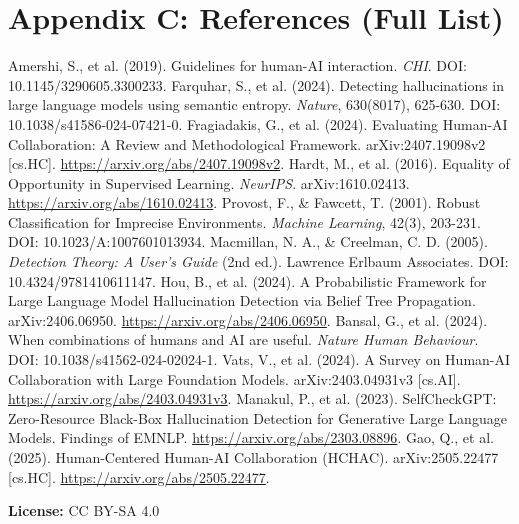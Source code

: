 \documentclass{article}
\begin{document}
\section*{Appendix C: References (Full List)}  

Amershi, S., et al. (2019). Guidelines for human-AI interaction. \textit{CHI}. DOI: 10.1145/3290605.3300233.  
Farquhar, S., et al. (2024). Detecting hallucinations in large language models using semantic entropy. \textit{Nature}, 630(8017), 625-630. DOI: 10.1038/s41586-024-07421-0.  
Fragiadakis, G., et al. (2024). Evaluating Human-AI Collaboration: A Review and Methodological Framework. arXiv:2407.19098v2 [cs.HC]. \url{https://arxiv.org/abs/2407.19098v2}.  
Hardt, M., et al. (2016). Equality of Opportunity in Supervised Learning. \textit{NeurIPS}. arXiv:1610.02413. \url{https://arxiv.org/abs/1610.02413}.  
Provost, F., \& Fawcett, T. (2001). Robust Classification for Imprecise Environments. \textit{Machine Learning}, 42(3), 203-231. DOI: 10.1023/A:1007601013934.  
Macmillan, N. A., \& Creelman, C. D. (2005). \textit{Detection Theory: A User's Guide} (2nd ed.). Lawrence Erlbaum Associates. DOI: 10.4324/9781410611147.  
Hou, B., et al. (2024). A Probabilistic Framework for Large Language Model Hallucination Detection via Belief Tree Propagation. arXiv:2406.06950. \url{https://arxiv.org/abs/2406.06950}.  
Bansal, G., et al. (2024). When combinations of humans and AI are useful. \textit{Nature Human Behaviour}. DOI: 10.1038/s41562-024-02024-1.  
Vats, V., et al. (2024). A Survey on Human-AI Collaboration with Large Foundation Models. arXiv:2403.04931v3 [cs.AI]. \url{https://arxiv.org/abs/2403.04931v3}.  
Manakul, P., et al. (2023). SelfCheckGPT: Zero-Resource Black-Box Hallucination Detection for Generative Large Language Models. Findings of EMNLP. \url{https://arxiv.org/abs/2303.08896}.  
Gao, Q., et al. (2025). Human-Centered Human-AI Collaboration (HCHAC). arXiv:2505.22477 [cs.HC]. \url{https://arxiv.org/abs/2505.22477}.  

\textbf{License:} CC BY-SA 4.0  
\end{document}

